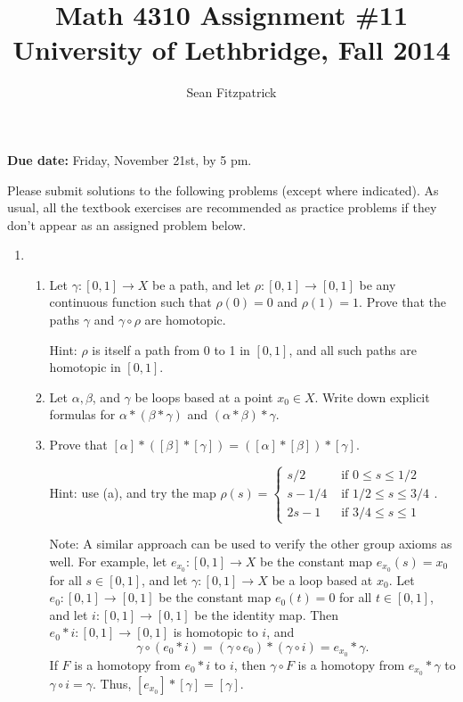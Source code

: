 \documentclass[letterpaper,12pt]{article}
\title{Math 4310 Assignment \#11\\University of Lethbridge, Fall 2014}
\author{Sean Fitzpatrick}
\newcommand{\cla}[1]{\left[ #1\right]}
\begin{document}
 \maketitle

{\bf Due date:} Friday, November 21st, by 5 pm.

\bigskip

Please submit solutions to the following problems (except where indicated). As usual, all the textbook exercises are recommended as practice problems if they don't appear as an assigned problem below.

\begin{enumerate}
\item \begin{enumerate}
\item Let $\gamma: [0,1]\to X$ be a path, and let $\rho:[0,1]\to [0,1]$ be any continuous function such that $\rho(0)=0$ and $\rho(1)=1$. Prove that the paths $\gamma$ and $\gamma\circ \rho$ are homotopic.

Hint: $\rho$ is itself a path from 0 to 1 in $[0,1]$, and all such paths are homotopic in $[0,1]$.
\item Let $\alpha, \beta$, and $\gamma$ be loops based at a point $x_0\in X$. Write down explicit formulas for $\alpha\ast(\beta\ast\gamma)$ and $(\alpha\ast\beta)\ast\gamma$.
\item Prove that $\cla{\alpha}\ast(\cla{\beta}\ast\cla{\gamma}) = (\cla{\alpha}\ast\cla{\beta})\ast\cla{\gamma}$.

Hint: use (a), and try the map $\displaystyle \rho(s)=\begin{cases} s/2 & \text{ if } 0\leq s\leq 1/2\\ s-1/4 & \text{ if } 1/2\leq s\leq 3/4\\ 2s-1 & \text{ if } 3/4\leq s\leq 1\end{cases}$.

Note: A similar approach can be used to verify the other group axioms as well. For example, let $e_{x_0}:[0,1]\to X$ be the constant map $e_{x_0}(s)=x_0$ for all $s\in [0,1]$, and let $\gamma:[0,1]\to X$ be a loop based at $x_0$. Let $e_0:[0,1]\to [0,1]$ be the constant map $e_0(t)=0$ for all $t\in [0,1]$, and let $i:[0,1]\to [0,1]$ be the identity map. Then $e_0\ast i:[0,1]\to [0,1]$ is homotopic to $i$, and 
\[
\gamma\circ(e_0\ast i) = (\gamma \circ e_0)\ast (\gamma \circ i) = e_{x_0}\ast \gamma.
\]
If $F$ is a homotopy from $e_0\ast i$ to $i$, then $\gamma\circ F$ is a homotopy from $e_{x_0}\ast \gamma$ to $\gamma\circ i = \gamma$. Thus, $\cla{e_{x_0}}\ast\cla{\gamma} = \cla{\gamma}$.



\end{enumerate}
\end{enumerate}
\end{document}
